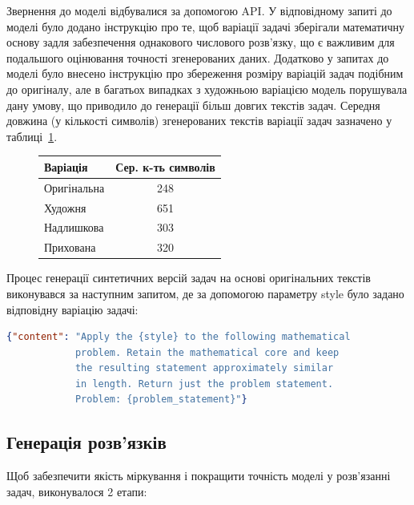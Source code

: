 Звернення до моделі відбувалися за допомогою API. У відповідному запиті до моделі було додано інструкцію про те, щоб варіації задачі зберігали математичну основу задля забезпечення однакового числового розв'язку, що є важливим для подальшого оцінювання точності згенерованих даних. Додатково у запитах до моделі було внесено інструкцію про збереження розміру варіацій задач подібним до оригіналу, але в багатьох випадках з художньою варіацією модель порушувала дану умову, що приводило до генерації більш довгих текстів задач. Середня довжина (у кількості символів) згенерованих текстів варіації задач зазначено у таблиці~\ref{tab:var_len}.

\begin{figure}
    \centering
    \label{tab:var_len}
    \begin{tabular}{|l|c|}
    \hline
    Варіація & Сер. к-ть символів \\
    \hline
     Оригінальна & 248 \\
     Художня & 651 \\
     Надлишкова & 303 \\
     Прихована & 320 \\
     \hline
    \end{tabular}
\end{figure}

Процес генерації синтетичних версій задач на основі оригінальних текстів виконувався за наступним запитом, де за допомогою параметру style було задано відповідну варіацію задачі:

\begin{lstlisting}[language=json, breaklines=true]
{"content": "Apply the {style} to the following mathematical 
            problem. Retain the mathematical core and keep
            the resulting statement approximately similar 
            in length. Return just the problem statement. 
            Problem: {problem_statement}"}
\end{lstlisting}

\subsection{Генерація розв'язків}

Щоб забезпечити якість міркування і покращити точність моделі у розв'язанні задач, виконувалося 2 етапи:

